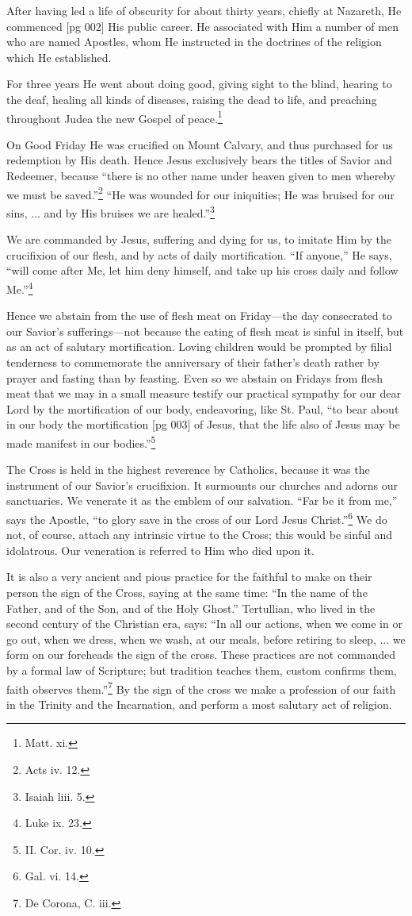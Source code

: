 After having led a life of obscurity for about
thirty years, chiefly at Nazareth, He commenced
[pg 002]
His public career. He associated with Him a
number of men who are named Apostles, whom
He instructed in the doctrines of the religion which
He established.

For three years He went about doing good,
giving sight to the blind, hearing to the deaf, healing
all kinds of diseases, raising the dead to life,
and preaching throughout Judea the new Gospel
of peace.\footnote{Matt. xi.}

On Good Friday He was crucified on Mount Calvary,
and thus purchased for us redemption by
His death. Hence Jesus exclusively bears the
titles of Savior and Redeemer,
because “there is
no other name under heaven given to men whereby
we must be saved.”\footnote{Acts iv. 12.}
“He was wounded for our
iniquities; He was bruised for our sins, ... and
by His bruises we are healed.”\footnote{Isaiah liii. 5.}

We are commanded by Jesus, suffering and dying
for us, to imitate Him by the crucifixion of our
flesh, and by acts of daily mortification. “If anyone,”
He says, “will come after Me, let him deny
himself, and take up his cross daily and follow
Me.”\footnote{Luke ix. 23.}

Hence we abstain from the use of flesh meat on
Friday—the day consecrated to our Savior's sufferings—not
because the eating of flesh meat is
sinful in itself, but as an act of salutary mortification.
Loving children would be prompted by filial
tenderness to commemorate the anniversary of
their father's death rather by prayer and fasting
than by feasting. Even so we abstain on Fridays
from flesh meat that we may in a small measure
testify our practical sympathy for our dear Lord
by the mortification of our body, endeavoring, like
St. Paul, “to bear about in our body the mortification
[pg 003]
of Jesus, that the life also of Jesus may be
made manifest in our bodies.”\footnote{II. Cor. iv. 10.}

The Cross is held in the highest reverence by
Catholics, because it was the instrument of our
Savior's crucifixion. It surmounts our churches
and adorns our sanctuaries. We venerate it as
the emblem of our salvation. “Far be it from
me,” says the Apostle, “to glory save in the cross
of our Lord Jesus Christ.”\footnote{Gal.
vi. 14.} We do not, of
course, attach any intrinsic virtue to the Cross;
this would be sinful and idolatrous. Our veneration
is referred to Him who died upon it.

It is also a very ancient and pious practice for
the faithful to make on their person the sign of the
Cross, saying at the same time: “In the name of
the Father, and of the Son, and of the Holy
Ghost.” Tertullian, who lived in the second century
of the Christian era, says: “In all our actions,
when we come in or go out, when we dress,
when we wash, at our meals, before retiring to
sleep, ... we form on our foreheads the sign of
the cross. These practices are not commanded by
a formal law of Scripture; but tradition teaches
them, custom confirms them, faith observes
them.”\footnote{De Corona, C.
iii.} By the sign of the cross we make a profession
of our faith in the Trinity and the Incarnation,
and perform a most salutary act of religion.

